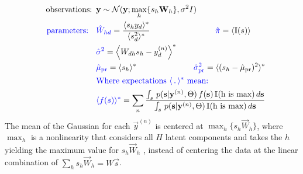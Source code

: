 \begin{description}
\begin{align}
 \text{observations:}\,\,\, &\vec{y} \sim \mathcal{N}(\vec{y}; \max_{h}\{s_h\vec{W}_{h}\}, \sigma^2\One)\nonumber\\
%
%
\rev{\text{\quad parameters: }} \,\,\,\nonumber %
%
&\rev{\hat{W}_{hd}}   = \frac{\langle s_h y_d \rangle^*}{\langle s_d^2 \rangle^*} 
 \text{\quad}\text{\quad}\text{\quad}\text{\quad}\text{\quad}\text{\quad}
\text{\quad}\text{\quad}\rev{\hat{\pi}} = \langle \mathbb{I}(s) \rangle  \text{\quad}\nonumber\\
%
&\rev{\hat{\sigma}^2} = \left\langle W_{dh} s_h - y_d^{(n)}\right\rangle^\ast \nonumber\\
%
&\rev{\hat{\mu}_{\pr}} = \langle s_h \rangle^* 
 \text{\quad}\text{\quad}\text{\quad}\text{\quad}\text{\quad}\text{\quad}\text{\quad}
\rev{\hat{\sigma}^2_{\pr}} = \langle (s_h - \hat{\mu}_{\pr})^2 \rangle^* \nonumber\\
%
%
&\rev{\text{Where expectations $\langle \,.\, \rangle^*$ mean:}}\nonumber\\
%
&\rev{\langle f(s) \rangle^\ast} = \sum_n \frac{ \int_s \, p(\vec{s}|\vec{y}^{(n)},\Theta) \, f(\vec{s}) \, \mathbb{I}(\text{h is max}) \, d\vec{s} }
                                       { \int_s \, p(\vec{s}|\vec{y}^{(n)},\Theta) \, \mathbb{I}(\text{h is max}) \, d\vec{s} } \nonumber
\end{align}
%
The mean of the Gaussian for each $\vec{y}^{(n)}$ is centered at $\max_{h}\{s_h\vec{W}_{h}\}$, where $\max_{h}$ is a nonlinearity that considers all $H$ latent components and takes the $h$ yielding the maximum value for $s_h\vec{W}_{h}$ \citep{LuckeSahani2008,SheltonEtAl2012,BornscheinEtAl2013,SheltonEtAl2015}, instead of centering the data at the linear combination of $\sum_h s_h\vec{W}_h=W\vec{s}$.
%
\end{description}

